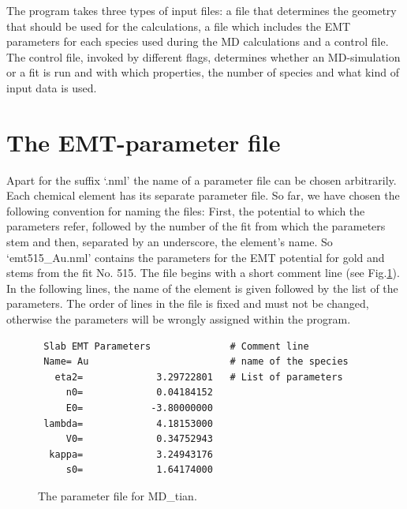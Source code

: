 \documentclass[twoside, 11pt, titlepage, captions=nooneline, a4paper, headsepline]{scrbook}%
\begin{document}
The program takes three types of input files: a file that determines the geometry that should be used for the calculations, a file which includes the EMT parameters for each species used during the MD calculations and a control file. The control file, invoked by different flags, determines whether an MD-simulation or a fit is run and with which properties, the number of species and what kind of input data is used.

\section{The EMT-parameter file}
Apart for the suffix `.nml' the name of a parameter file can be chosen arbitrarily. Each chemical element has its separate parameter file. So far, we have chosen the following convention for naming the files: First, the potential to which the parameters refer, followed by the number of the fit from which the parameters stem and then, separated by an underscore, the element's name. So `emt515\_Au.nml' contains the parameters for the EMT potential for gold and stems from the fit No. 515. The file begins with a short comment line (see Fig.\ref{Fig:nmlfile}). In the following lines, the name of the element is given followed by the list of the parameters. The order of lines in the file is fixed and must not be changed, otherwise the parameters will be wrongly assigned within the program.
\begin{figure}[t!]
\begin{verbatim}
 Slab EMT Parameters              # Comment line
 Name= Au                         # name of the species
   eta2=             3.29722801   # List of parameters
     n0=             0.04184152
     E0=            -3.80000000
 lambda=             4.18153000
     V0=             0.34752943
  kappa=             3.24943176
     s0=             1.64174000
\end{verbatim}
\caption{\label{Fig:nmlfile}The parameter file for MD\_tian.}
\end{figure}
\end{document}
